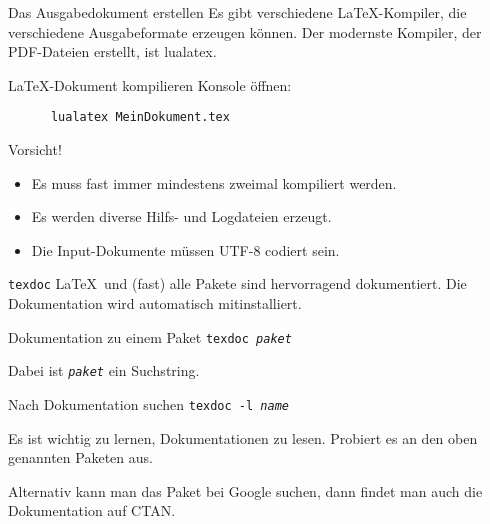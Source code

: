 \begin{frame}[fragile]{Das Ausgabedokument erstellen}
  Es gibt verschiedene \LaTeX-Kompiler, die verschiedene Ausgabeformate erzeugen können.
  Der modernste Kompiler, der PDF-Dateien erstellt, ist \alert{lualatex}.

  \begin{block}{\LaTeX-Dokument kompilieren}
    Konsole öffnen:
    \begin{lstlisting}
      lualatex MeinDokument.tex
    \end{lstlisting}
  \end{block}
  \begin{alertblock}{Vorsicht!}
    \begin{itemize}
      \item Es muss fast immer mindestens zweimal kompiliert werden.
      \item Es werden diverse Hilfs- und Logdateien erzeugt.
      \item Die Input-Dokumente müssen UTF-8 codiert sein.
    \end{itemize}
  \end{alertblock}
\end{frame}

\begin{frame}{\texttt{texdoc}}
  \LaTeX\ und (fast) alle Pakete sind hervorragend dokumentiert. Die Dokumentation wird automatisch mitinstalliert.
  \begin{block}{Dokumentation zu einem Paket}
    \texttt{texdoc \textit{paket}}
  \end{block}

  Dabei ist \texttt{\textit{paket}} ein Suchstring.
  \begin{block}{Nach Dokumentation suchen}
    \texttt{texdoc -l \textit{name}}
  \end{block}

  Es ist wichtig zu lernen, Dokumentationen zu lesen. Probiert es an den oben genannten Paketen aus.

  \vspace{10pt}
  Alternativ kann man das Paket bei Google suchen, dann findet man auch die Dokumentation auf CTAN.
\end{frame}
